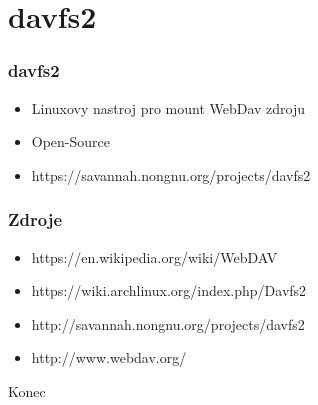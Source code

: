 \documentclass{beamer}
\begin{document}
\section{davfs2}
\begin{frame}
\frametitle{davfs2}
\begin{itemize}
    \item{Linuxovy nastroj pro mount WebDav zdroju}
    \item Open-Source
    \item{https://savannah.nongnu.org/projects/davfs2}
\end{itemize}
\end{frame}

\begin{frame}
\frametitle{Zdroje}
    \begin{itemize}
        \item https://en.wikipedia.org/wiki/WebDAV
        \item https://wiki.archlinux.org/index.php/Davfs2
        \item http://savannah.nongnu.org/projects/davfs2
        \item http://www.webdav.org/
    \end{itemize}
\end{frame}


\begin{frame}
\Huge{\centerline{Konec}}
\end{frame}

\end{document}
